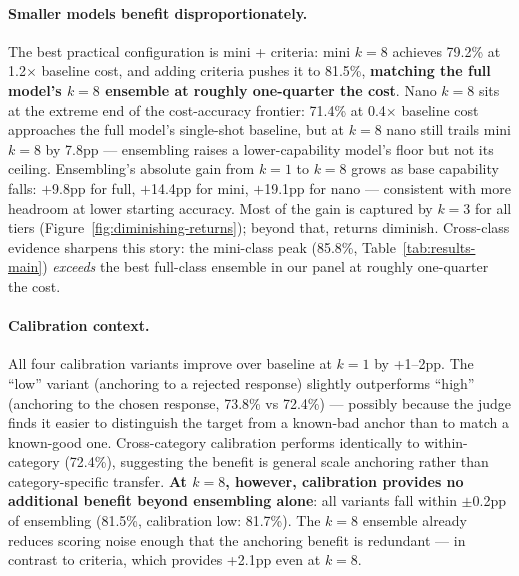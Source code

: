 \documentclass{article}
\begin{document}
\paragraph{Smaller models benefit disproportionately.} The best practical configuration is mini + criteria: mini $k{=}8$ achieves 79.2\% at 1.2$\times$ baseline cost, and adding criteria pushes it to 81.5\%, \textbf{matching the full model's $k{=}8$ ensemble at roughly one-quarter the cost}. Nano $k{=}8$ sits at the extreme end of the cost-accuracy frontier: 71.4\% at 0.4$\times$ baseline cost approaches the full model's single-shot baseline, but at $k{=}8$ nano still trails mini $k{=}8$ by 7.8pp --- ensembling raises a lower-capability model's floor but not its ceiling. Ensembling's absolute gain from $k{=}1$ to $k{=}8$ grows as base capability falls: $+$9.8pp for full, $+$14.4pp for mini, $+$19.1pp for nano --- consistent with more headroom at lower starting accuracy. Most of the gain is captured by $k{=}3$ for all tiers (Figure~\ref{fig:diminishing-returns}); beyond that, returns diminish. Cross-class evidence sharpens this story: the mini-class peak (85.8\%, Table~\ref{tab:results-main}) \emph{exceeds} the best full-class ensemble in our panel at roughly one-quarter the cost.

\paragraph{Calibration context.} All four calibration variants improve over baseline at $k{=}1$ by +1--2pp. The ``low'' variant (anchoring to a rejected response) slightly outperforms ``high'' (anchoring to the chosen response, 73.8\% vs 72.4\%) --- possibly because the judge finds it easier to distinguish the target from a known-bad anchor than to match a known-good one. Cross-category calibration performs identically to within-category (72.4\%), suggesting the benefit is general scale anchoring rather than category-specific transfer. \textbf{At $k{=}8$, however, calibration provides no additional benefit beyond ensembling alone}: all variants fall within $\pm$0.2pp of ensembling (81.5\%, calibration low: 81.7\%). The $k{=}8$ ensemble already reduces scoring noise enough that the anchoring benefit is redundant --- in contrast to criteria, which provides +2.1pp even at $k{=}8$.
\end{document}

